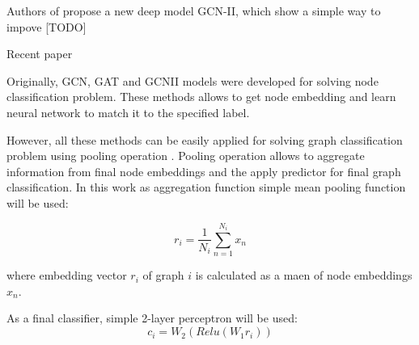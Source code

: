 Authors of \cite{GCNII} propose a new deep model GCN-II, which show a simple way to impove [TODO]

Recent paper \cite{GCNII}





Originally, GCN, GAT and GCNII models were developed for solving node classification problem.
These methods allows to get node embedding and learn neural network to match it to the specified label.

However, all these methods can be easily applied for solving graph classification problem using pooling operation \cite{distillGCN}.
Pooling operation allows to aggregate information from final node embeddings and the apply predictor for final graph classification.
In this work as aggregation function simple mean pooling function will be used:

\begin{equation}
    r_i = \frac{1}{N_i}\sum_{n=1}^{N_i}x_n
    \label{eq:mean_pool}
\end{equation}

where embedding vector $r_i$ of graph $i$ is calculated as a maen of node embeddings $x_n$.

As a final classifier, simple 2-layer perceptron will be used:
\begin{equation}
    c_i = W_2(Relu(W_1r_i))
    \label{eq:final_classifier}
\end{equation}


